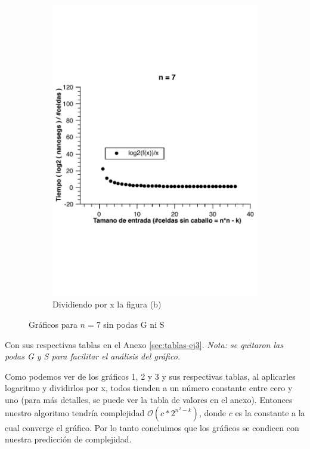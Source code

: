 \begin{figure}[H]
        \begin{subfigure}[b]{0.5\textwidth}
                \includegraphics[width=\textwidth]{imagenes/grafico3-n-7-div-log.pdf}
                \caption{Dividiendo por x la figura (b)}
        \end{subfigure}
        \caption{Gráficos para $n=7$ sin podas G ni S}
\end{figure}

Con sus respectivas tablas en el Anexo \ref{sec:tablas-ej3}. \textit{Nota: se quitaron las podas G y S para facilitar el análisis del gráfico.}

Como podemos ver de los gráficos 1, 2 y 3 y sus respectivas tablas, al aplicarles logaritmo y dividirlos por x, todos tienden a un número constante entre cero y uno (para más detalles, se puede ver la tabla de valores en el anexo). Entonces nuestro algoritmo tendría complejidad $\mathcal{O}(c*2^{n^2 - k})$, donde $c$ es la constante a la cual converge el gráfico. Por lo tanto concluimos que los gráficos se condicen con nuestra predicción de complejidad.

